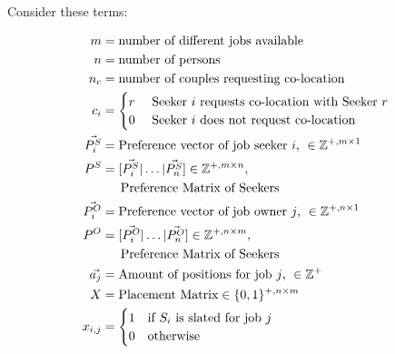 Consider these terms:

\begin{align}
m &= \text{number of different jobs available}\\
n &= \text{number of persons}\\
n_c &= \text{number of couples requesting co-location}\\
c_i &= \begin{cases}
r & \text{ Seeker $i$ requests co-location with Seeker $r$} \\
0 & \text{ Seeker $i$ does not request co-location}
\end{cases} \\
\vec{P^S_i} &= \text{Preference vector of job seeker $i$, } \in \mathbb{Z}^{+, m \times 1} \\
P^S &= [\vec{P^S_i} | \dots | \vec{P^S_n}] \in \mathbb{Z}^{+, m \times n}, \\ 
&\text{\indent Preference Matrix of Seekers} \\
\vec{P^O_i} &= \text{Preference vector of job owner $j$, } \in \mathbb{Z}^{+, n \times 1} \\
P^O &= [\vec{P^O_i} | \dots | \vec{P^O_n}] \in \mathbb{Z}^{+, n \times m}, \\ 
&\text{\indent Preference Matrix of Seekers} \\
\vec{a_j} &= \text{Amount of positions for job $j$, } \in \mathbb{Z}^{+} \\
X &= \text{Placement Matrix} \in \{0,1\}^{+, n \times m} \\
x_{i,j} &= \begin{cases}
1 & \text{if $S_i$ is slated for job $j$}\\
0 & \text{otherwise}
\end{cases}
\end{align}

